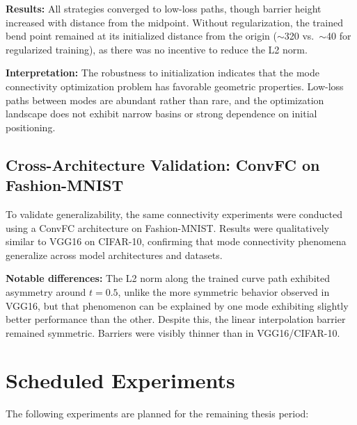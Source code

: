 \documentclass[11pt,a4paper]{article}
\begin{document}
\textbf{Results:} All strategies converged to low-loss paths, though barrier height increased with distance from the midpoint. Without regularization, the trained bend point remained at its initialized distance from the origin ($\sim$320 vs.\ $\sim$40 for regularized training), as there was no incentive to reduce the L2 norm.

\textbf{Interpretation:} The robustness to initialization indicates that the mode connectivity optimization problem has favorable geometric properties. Low-loss paths between modes are abundant rather than rare, and the optimization landscape does not exhibit narrow basins or strong dependence on initial positioning.

\subsection{Cross-Architecture Validation: ConvFC on Fashion-MNIST}

To validate generalizability, the same connectivity experiments were conducted using a ConvFC architecture on Fashion-MNIST. Results were qualitatively similar to VGG16 on CIFAR-10, confirming that mode connectivity phenomena generalize across model architectures and datasets.

\textbf{Notable differences:} The L2 norm along the trained curve path exhibited asymmetry around $t=0.5$, unlike the more symmetric behavior observed in VGG16, but that phenomenon can be explained by one mode exhibiting slightly better performance than the other. Despite this, the linear interpolation barrier remained symmetric. Barriers were visibly thinner than in VGG16/CIFAR-10.

\section{Scheduled Experiments}

The following experiments are planned for the remaining thesis period:
\end{document}
